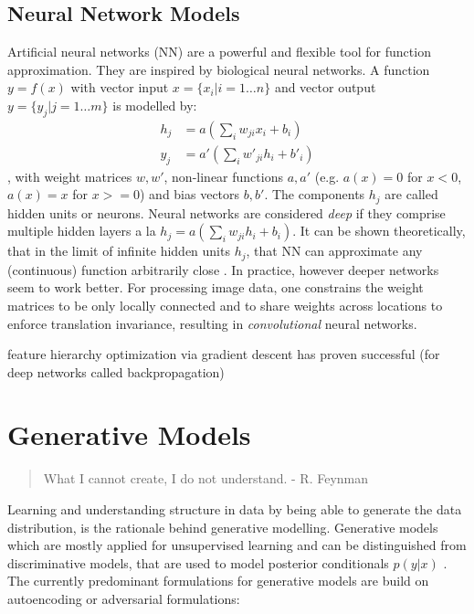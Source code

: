 	\subsection{Neural Network Models}
		Artificial neural networks (NN) are a powerful and flexible tool for function approximation. They are inspired by biological neural networks. A function $y = f(x)$ with vector input $x = \{ x_i | i = 1 \ldots n \}$ and vector output $y = \{ y_j | j = 1 \ldots m \}$ is modelled by:
		\begin{equation} \label{eq1}
		\begin{split}
		h_j & =  a (\sum_i w_{ji} x_i + b_i)  \\
		y_j & =  a' (\sum_i w'_{ji} h_i + b'_i)
		\end{split}
		\end{equation},
		with weight matrices $w, w'$, non-linear functions $a, a'$ (e.g. $a(x)=0$ for $x<0$, $a(x)=x$ for $x>=0$) and bias vectors $b, b'$.
		The components $h_j$ are called hidden units or neurons. Neural networks are considered \textit{deep} if they comprise multiple hidden layers a la $h_j  =  a (\sum_i w_{ji} h_i + b_i)$.
		It can be shown theoretically, that in the limit of infinite hidden units $h_j$, that NN can approximate any (continuous) function arbitrarily close \cite{cybenko89approx}.
		In practice, however deeper networks seem to work better. For processing image data, one constrains the weight matrices to be only locally connected and to share weights across locations to enforce translation invariance, resulting in \textit{convolutional} neural networks.

		feature hierarchy \cite{zeiler14vis}
		optimization via gradient descent has proven successful (for deep networks called backpropagation)

\section{Generative Models}\label{sec:genmodel}
	\begin{quote}
	    What I cannot create, I do not understand. - R. Feynman
	\end{quote}
	Learning and understanding structure in data by being able to generate the data distribution, is the rationale behind generative modelling.
	Generative models which are mostly applied for unsupervised learning and can be distinguished from discriminative models, that are used to model posterior conditionals $p(y|x)$ \cite{bishop06ml}.
	The currently predominant formulations for generative models are build on autoencoding or adversarial formulations:

